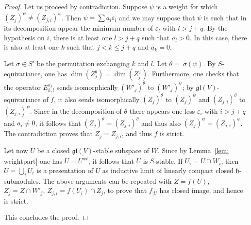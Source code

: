 \documentclass[12pt,reqno]{amsart}
\theoremstyle{definition}
\theoremstyle{remark}
\begin{document}
\begin{proof}
	Let us proceed by contradiction. Suppose $\psi$ is a weight for which 
	$(Z_j)^\psi \neq (Z_{j, i})^\psi$. Then $\psi = \sum a_l \varepsilon_l$ and we may suppose that $\psi$ is such that in its decomposition appear the minimum number of $\varepsilon_l$ with $l>j+q$. By the hypothesis on $i$, there is at least one $l>j+q$ such that $a_l > 0$. In this case, there is also at least one $k$ such that $j < k \leq j+q$ and $a_k = 0$. 
	
	Let $\sigma\in S'$ be the permutation exchanging $k$ and $l$. Let $\theta = \ \sigma ( \psi )$. By $S$-equivariance, one has $\dim(Z_j^{\theta}) = \dim(Z_j^{\psi})$. Furthermore, one checks that the operator $E_{k,l}^{a_k}$ sends isomorphically $(W'_j)^{\theta}$ to $(W'_j)^{\psi}$; by $\mathfrak{gl}(V)$-equivariance of $f$, it also sends isomorphically $(Z_j)^{\theta}$ to $(Z_j)^{\psi}$ and $(Z_{j, i})^{\theta}$ to $(Z_{j, i})^{\psi}$. Since in the decomposition of $\theta$ there appears one less $\varepsilon_i$ with $i>j+q$ and $a_i \neq 0$, it follows that $(Z_j)^{\theta}=(Z_{j, i})^{\theta}$ and thus also $(Z_j)^{\psi}=(Z_{j, i})^{\psi}$. The contradiction proves that $Z_j = Z_{j, i}$, and thus $f$ is strict.
	
	Let now $U$ be a closed $\mathfrak{gl}(V)$-stable subspace of $W$. Since by Lemma~\ref{lem: weightpart} one has $U = \overline{U^{wt}}$, it follows that $U$ is $S$-stable. If $U_i = U\cap W_i$, then $U=\bigcup_i U_i$ is a presentation of $U$ as inductive limit of linearly compact closed $\mathfrak{h}$-submodules. The above arguments can be repeated with $Z=f(U)$, $Z_j = Z\cap W'_j$, $Z_{j,i}=f(U_i)\cap Z_j$, to prove that $f_{|U}$ has closed image, and hence is strict.
	
	This concludes the proof.
	\end{proof}
	
\end{document}
